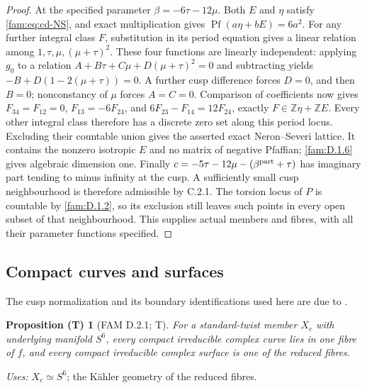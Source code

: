 \documentclass[11pt,a4paper]{article}
\theoremstyle{plain}
\newtheorem{proposition}[theorem]{Proposition (T)}
\theoremstyle{definition}
\begin{document}
\begin{proof}
At the specified parameter $\beta=-6\tau-12\mu$. Both $E$ and $\eta$
satisfy \eqref{fam:eq:cd-NS}, and exact multiplication gives
$\operatorname{Pf}(a\eta+bE)=6a^2$.
For any further integral class $F$, substitution in its period equation
gives a linear relation among $1,\tau,\mu,(\mu+\tau)^2$.
These four functions are linearly independent: applying $g_0$ to a
relation $A+B\tau+C\mu+D(\mu+\tau)^2=0$ and subtracting yields
$-B+D(1-2(\mu+\tau))=0$. A further cusp difference forces $D=0$,
and then $B=0$; nonconstancy of $\mu$ forces $A=C=0$.
Comparison of coefficients now gives
$F_{34}=F_{12}=0$, $F_{13}=-6F_{24}$, and
$6F_{23}-F_{14}=12F_{24}$, exactly
$F\in\mathbb Z\eta+\mathbb ZE$. Every other integral class therefore
has a discrete zero set along this period locus. Excluding their
countable union gives the asserted exact Neron--Severi lattice.
It contains the nonzero isotropic $E$ and no matrix of negative
Pfaffian; \ref{fam:D.1.6} gives algebraic dimension one.
Finally
$c=-5\tau-12\mu-(\beta^{\rm part}+\tau)$ has imaginary part tending
to minus infinity at the cusp. A sufficiently small cusp neighbourhood
is therefore admissible by C.2.1. The torsion locus of $P$ is countable
by \ref{fam:D.1.2}, so its exclusion still leaves such points in every open subset
of that neighbourhood. This supplies actual members and fibres, with
all their parameter functions specified.
\end{proof}

\subsection{Compact curves and surfaces}
The cusp normalization and its boundary identifications used here are due to \cite[\S4.6, Proposition~4.6]{AC26}.
\begin{proposition}[FAM D.2.1; T]\label{fam:D.2.1}
For a standard-twist member \(X_c\) with underlying manifold \(S^6\),
every compact irreducible complex curve lies in one fibre of \(f\), and
every compact irreducible complex surface is one of the reduced fibres.
\end{proposition}
\noindent\emph{Uses:} $X_c\simeq S^6$; the K\"ahler geometry of the reduced fibres.\par
\end{document}
